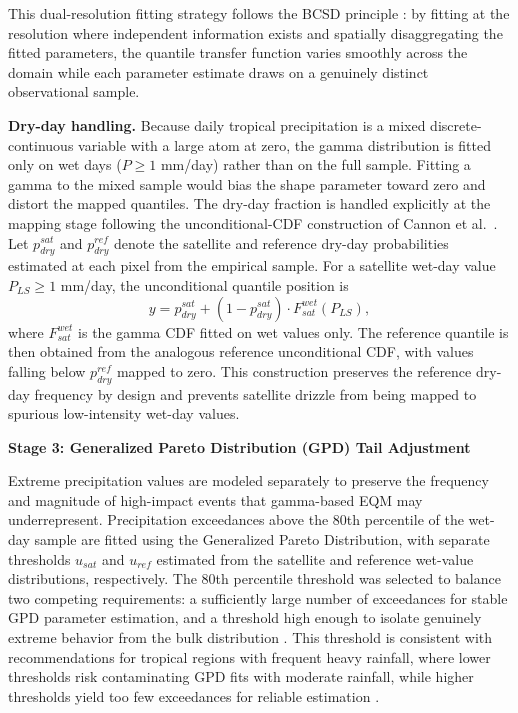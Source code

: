 \documentclass[11pt,a4paper]{article}
\begin{document}
This dual-resolution fitting strategy follows the BCSD principle
\cite{ref23}: by fitting at the resolution where independent information
exists and spatially disaggregating the fitted parameters, the quantile
transfer function varies smoothly across the domain while each parameter
estimate draws on a genuinely distinct observational sample.

\textbf{Dry-day handling.} Because daily tropical precipitation is a
mixed discrete-continuous variable with a large atom at zero, the gamma
distribution is fitted only on wet days (\(P \geq 1\) mm/day) rather
than on the full sample. Fitting a gamma to the mixed sample would bias
the shape parameter toward zero and distort the mapped quantiles. The
dry-day fraction is handled explicitly at the mapping stage following
the unconditional-CDF construction of Cannon et al.~\cite{ref11}. Let
\(p_{dry}^{sat}\) and \(p_{dry}^{ref}\) denote the satellite and
reference dry-day probabilities estimated at each pixel from the
empirical sample. For a satellite wet-day value \(P_{LS} \geq 1\)
mm/day, the unconditional quantile position is
\begin{equation}y = p_{dry}^{sat} + (1 - p_{dry}^{sat}) \cdot F_{sat}^{wet}(P_{LS}),\end{equation}
where \(F_{sat}^{wet}\) is the gamma CDF fitted on wet values only. The
reference quantile is then obtained from the analogous reference
unconditional CDF, with values falling below \(p_{dry}^{ref}\) mapped to
zero. This construction preserves the reference dry-day frequency by
design and prevents satellite drizzle from being mapped to spurious
low-intensity wet-day values.

\textbf{Stage 3: Generalized Pareto Distribution (GPD) Tail Adjustment}

Extreme precipitation values are modeled separately to preserve the
frequency and magnitude of high-impact events that gamma-based EQM may
underrepresent. Precipitation exceedances above the 80th percentile of
the wet-day sample are fitted using the Generalized Pareto Distribution,
with separate thresholds \(u_{sat}\) and \(u_{ref}\) estimated from the
satellite and reference wet-value distributions, respectively. The 80th
percentile threshold was selected to balance two competing requirements:
a sufficiently large number of exceedances for stable GPD parameter
estimation, and a threshold high enough to isolate genuinely extreme
behavior from the bulk distribution \cite{ref7}. This threshold is
consistent with recommendations for tropical regions with frequent heavy
rainfall, where lower thresholds risk contaminating GPD fits with
moderate rainfall, while higher thresholds yield too few exceedances for
reliable estimation \cite{ref25}.
\end{document}
